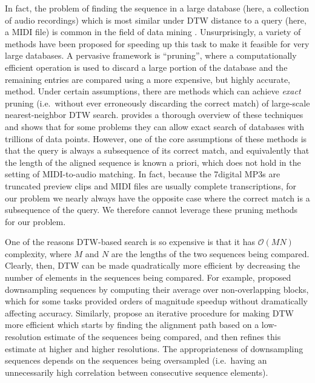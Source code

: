 In fact, the problem of finding the sequence in a large database (here, a collection of audio recordings) which is most similar under DTW distance to a query (here, a MIDI file) is common in the field of data mining \cite{berndt1994using}.
Unsurprisingly, a variety of methods have been proposed for speeding up this task to make it feasible for very large databases.
A pervasive framework is ``pruning'', where a computationally efficient operation is used to discard a large portion of the database and the remaining entries are compared using a more expensive, but highly accurate, method.
Under certain assumptions, there are methods which can achieve {\em exact} pruning (i.e.\ without ever erroneously discarding the correct match) of large-scale nearest-neighbor DTW search.
\cite{rakthanmanon2012searching} provides a thorough overview of these techniques and shows that for some problems they can allow exact search of databases with trillions of data points.
However, one of the core assumptions of these methods is that the query is always a subsequence of its correct match, and equivalently that the length of the aligned sequence is known a priori, which does not hold in the setting of MIDI-to-audio matching.
In fact, because the 7digital MP3s are truncated preview clips and MIDI files are usually complete transcriptions, for our problem we nearly always have the opposite case where the correct match is a subsequence of the query.
We therefore cannot leverage these pruning methods for our problem.

One of the reasons DTW-based search is so expensive is that it has $\mathcal{O}(MN)$ complexity, where $M$ and $N$ are the lengths of the two sequences being compared.
Clearly, then, DTW can be made quadratically more efficient by decreasing the number of elements in the sequences being compared.
For example, \cite{keogh2001dimensionality,yi2000fast} proposed downsampling sequences by computing their average over non-overlapping blocks, which for some tasks provided orders of magnitude speedup without dramatically affecting accuracy.
Similarly, \cite{salvador2007toward} propose an iterative procedure for making DTW more efficient which starts by finding the alignment path based on a low-resolution estimate of the sequences being compared, and then refines this estimate at higher and higher resolutions.
The appropriateness of downsampling sequences depends on the sequences being oversampled (i.e.\ having an unnecessarily high correlation between consecutive sequence elements).

